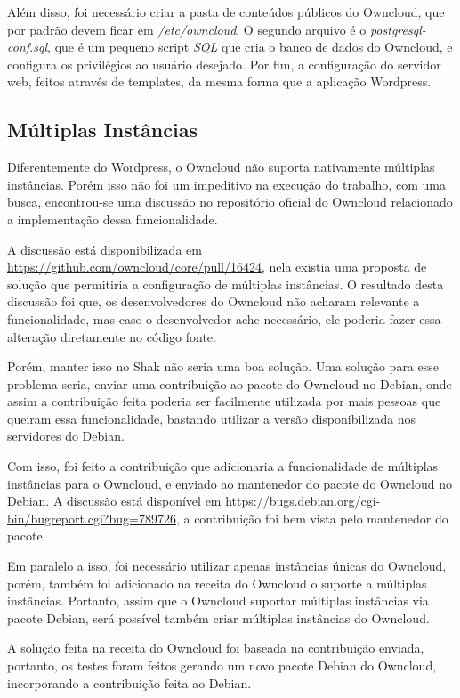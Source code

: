 Além disso, foi necessário criar a pasta de conteúdos públicos do Owncloud, que por
padrão devem ficar em \textit{/etc/owncloud}. O segundo arquivo é o 
\textit{postgresql-conf.sql}, que é um pequeno script \textit{SQL} que cria o 
banco de dados do Owncloud, e configura os
privilégios ao usuário desejado. Por fim, a configuração do servidor web, feitos
através de templates, da mesma forma que a aplicação Wordpress.

\subsection{Múltiplas Instâncias}

Diferentemente do Wordpress, o Owncloud não suporta nativamente múltiplas instâncias. Porém isso
não foi um impeditivo na execução do trabalho, com uma busca, encontrou-se uma 
discussão no repositório oficial do Owncloud relacionado a implementação dessa 
funcionalidade. 

A discussão está disponibilizada em 
\url{https://github.com/owncloud/core/pull/16424}, nela existia
uma proposta de solução que permitiria a configuração de múltiplas instâncias. O
resultado desta discussão foi que, os desenvolvedores do Owncloud não acharam relevante
a funcionalidade, mas caso o desenvolvedor ache necessário, ele poderia fazer essa
alteração diretamente no código fonte.

Porém, manter isso no Shak não seria uma boa solução. Uma solução para esse problema seria, 
enviar uma contribuição ao pacote do Owncloud no Debian, onde assim a contribuição feita
poderia ser facilmente utilizada por mais pessoas que queiram essa funcionalidade,
bastando utilizar a versão disponibilizada nos servidores do Debian. 

Com isso, foi feito a contribuição que adicionaria a funcionalidade de múltiplas 
instâncias para o Owncloud, e enviado ao mantenedor do pacote do Owncloud no Debian. 
A discussão está disponível em \url{https://bugs.debian.org/cgi-bin/bugreport.cgi?bug=789726},
a contribuição foi bem vista pelo mantenedor do pacote.
 
Em paralelo a isso,
foi necessário utilizar apenas instâncias únicas do Owncloud, porém, também foi
adicionado na receita do Owncloud o suporte a múltiplas instâncias. Portanto, 
assim que o Owncloud suportar múltiplas instâncias via pacote Debian, será possível
também criar múltiplas instâncias do Owncloud.

A solução feita na receita do Owncloud foi baseada na contribuição enviada, portanto,
os testes foram feitos gerando um novo pacote Debian do Owncloud, incorporando
a contribuição feita ao Debian. 

